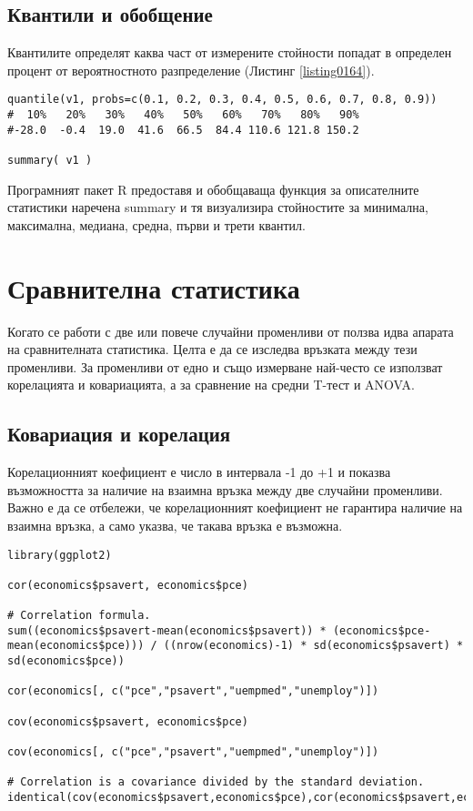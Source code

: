 \subsection{Квантили и обобщение}

Квантилите определят каква част от измерените стойности попадат в определен процент от вероятностното разпределение (Листинг \ref{listing0164}).

\begin{lstlisting}[caption=Квантили и обобщение, label=listing0165]
quantile(v1, probs=c(0.1, 0.2, 0.3, 0.4, 0.5, 0.6, 0.7, 0.8, 0.9))
#  10%   20%   30%   40%   50%   60%   70%   80%   90% 
#-28.0  -0.4  19.0  41.6  66.5  84.4 110.6 121.8 150.2 

summary( v1 )
\end{lstlisting}

Програмният пакет R предоставя и обобщаваща функция за описателните статистики наречена summary и тя визуализира стойностите за минимална, максимална, медиана, средна, първи и трети квантил.

\section{Сравнителна статистика}

Когато се работи с две или повече случайни променливи от ползва идва апарата на сравнителната статистика. Целта е да се изследва връзката между тези променливи. За променливи от едно и също измерване най-често се използват корелацията и ковариацията, а за сравнение на средни T-тест и ANOVA. 

\subsection{Ковариация и корелация}

Корелационният коефициент е число в интервала -1 до +1 и показва възможността за наличие на взаимна връзка между две случайни променливи. Важно е да се отбележи, че корелационният коефициент не гарантира наличие на взаимна връзка, а само указва, че такава връзка е възможна. 

\begin{lstlisting}[caption=Ковариация и корелация, label=listing0166]
library(ggplot2)

cor(economics$psavert, economics$pce)

# Correlation formula.
sum((economics$psavert-mean(economics$psavert)) * (economics$pce-mean(economics$pce))) / ((nrow(economics)-1) * sd(economics$psavert) * sd(economics$pce))

cor(economics[, c("pce","psavert","uempmed","unemploy")])

cov(economics$psavert, economics$pce)

cov(economics[, c("pce","psavert","uempmed","unemploy")])

# Correlation is a covariance divided by the standard deviation.
identical(cov(economics$psavert,economics$pce),cor(economics$psavert,economics$pce)*sd(economics$psavert)*sd(economics$pce))
\end{lstlisting}

